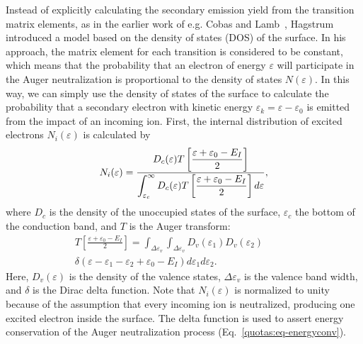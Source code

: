 \begin{refsection}
Instead of explicitly calculating the secondary emission yield from the 
transition matrix elements, as in the earlier work of e.g. Cobas and 
Lamb~\cite{Cobas1944}, Hagstrum introduced a model based on the density of 
states (\gls{DOS}) of the surface. In his approach, the matrix element for each 
transition is considered to be constant, which means that the probability that 
an electron of energy $\varepsilon$ will participate in the Auger 
neutralization is proportional to the density of states $N(\varepsilon)$. In 
this way, we can simply use the density of states of the surface to calculate 
the probability that a secondary electron with kinetic energy $\varepsilon_k = 
\varepsilon - \varepsilon_0$ is emitted from the impact of an incoming ion. 
First, the internal distribution of excited electrons $N_i(\varepsilon)$ is 
calculated by 
\begin{equation} \label{quotas:eq-excite} 
N_i(\varepsilon) = \frac{\displaystyle D_c(\varepsilon)T\left[\frac{\varepsilon + 
\varepsilon_0 - E_I}{2}\right]}{\displaystyle \int_{\varepsilon_c}^\infty D_c 
(\varepsilon)T\left[\frac{\varepsilon + \varepsilon_0 - 
E_I}{2}\right]d\varepsilon}, 
\end{equation} 
where $D_c$ is the density of the unoccupied states of the surface, 
$\varepsilon_c$ the bottom of the conduction band, and $T$ is the Auger 
transform: 
\begin{equation} 
\begin{aligned} 
T\left[\frac{\varepsilon + \varepsilon_0 - E_I}{2}\right] = 
\int_{\Delta\varepsilon_v}\int_{\Delta\varepsilon_v} D_v (\varepsilon_1) D_v 
(\varepsilon_2) \hspace{3em} \\ \delta(\varepsilon - \varepsilon_1 - 
\varepsilon_2 + \varepsilon_0 - E_I) d\varepsilon_1 d\varepsilon_2. 
\end{aligned} 
\end{equation} 
Here, $D_v(\varepsilon)$ is the density of the valence states, 
$\Delta\varepsilon_v$ is the valence band width, and $\delta$ is the Dirac 
delta function. Note that $N_i(\varepsilon)$ is normalized to unity because of 
the assumption that every incoming ion is neutralized, producing one excited 
electron inside the surface. The delta function is used to assert energy 
conservation of the Auger neutralization process 
(Eq.~\ref{quotas:eq-energyconv}). \\ 
 

\end{refsection}
